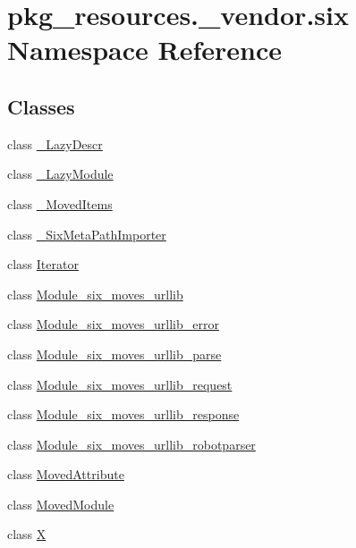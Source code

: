 \hypertarget{namespacepkg__resources_1_1__vendor_1_1six}{}\section{pkg\+\_\+resources.\+\_\+vendor.\+six Namespace Reference}
\label{namespacepkg__resources_1_1__vendor_1_1six}
\subsection*{Classes}
\begin{DoxyCompactItemize}
\item 
class \hyperlink{classpkg__resources_1_1__vendor_1_1six_1_1___lazy_descr}{\+\_\+\+Lazy\+Descr}
\item 
class \hyperlink{classpkg__resources_1_1__vendor_1_1six_1_1___lazy_module}{\+\_\+\+Lazy\+Module}
\item 
class \hyperlink{classpkg__resources_1_1__vendor_1_1six_1_1___moved_items}{\+\_\+\+Moved\+Items}
\item 
class \hyperlink{classpkg__resources_1_1__vendor_1_1six_1_1___six_meta_path_importer}{\+\_\+\+Six\+Meta\+Path\+Importer}
\item 
class \hyperlink{classpkg__resources_1_1__vendor_1_1six_1_1_iterator}{Iterator}
\item 
class \hyperlink{classpkg__resources_1_1__vendor_1_1six_1_1_module__six__moves__urllib}{Module\+\_\+six\+\_\+moves\+\_\+urllib}
\item 
class \hyperlink{classpkg__resources_1_1__vendor_1_1six_1_1_module__six__moves__urllib__error}{Module\+\_\+six\+\_\+moves\+\_\+urllib\+\_\+error}
\item 
class \hyperlink{classpkg__resources_1_1__vendor_1_1six_1_1_module__six__moves__urllib__parse}{Module\+\_\+six\+\_\+moves\+\_\+urllib\+\_\+parse}
\item 
class \hyperlink{classpkg__resources_1_1__vendor_1_1six_1_1_module__six__moves__urllib__request}{Module\+\_\+six\+\_\+moves\+\_\+urllib\+\_\+request}
\item 
class \hyperlink{classpkg__resources_1_1__vendor_1_1six_1_1_module__six__moves__urllib__response}{Module\+\_\+six\+\_\+moves\+\_\+urllib\+\_\+response}
\item 
class \hyperlink{classpkg__resources_1_1__vendor_1_1six_1_1_module__six__moves__urllib__robotparser}{Module\+\_\+six\+\_\+moves\+\_\+urllib\+\_\+robotparser}
\item 
class \hyperlink{classpkg__resources_1_1__vendor_1_1six_1_1_moved_attribute}{Moved\+Attribute}
\item 
class \hyperlink{classpkg__resources_1_1__vendor_1_1six_1_1_moved_module}{Moved\+Module}
\item 
class \hyperlink{classpkg__resources_1_1__vendor_1_1six_1_1_x}{X}
\end{DoxyCompactItemize}
